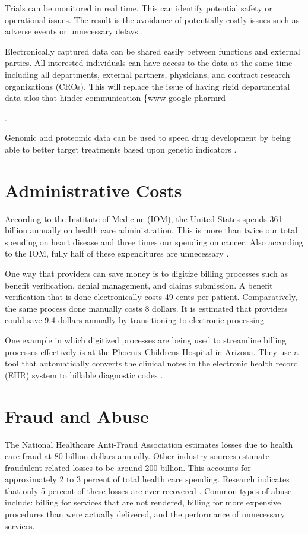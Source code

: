 \documentclass[sigconf]{acmart}
\begin{document}
{Trials can be monitored in real time. This can identify potential safety or operational issues. The result is the avoidance of potentially costly issues such as adverse events or unnecessary delays \cite{www-google-pharmrd}.

Electronically captured data can be shared easily between functions and external parties. All interested individuals can have access to the data at the same time including all departments, external partners, physicians, and contract research organizations (CROs). This will replace the issue of having rigid departmental data silos that hinder communication \{www-google-pharmrd}. 

Genomic and proteomic data can be used to speed drug development by being able to better target treatments based upon genetic indicators \cite{www-google-hadoop}.

\section{Administrative Costs}
According to the Institute of Medicine (IOM), the United States spends 361 billion annually on health care administration.  This is more than twice our total spending on heart disease and three times our spending on cancer. Also according to the IOM, fully half of these expenditures are unnecessary \cite{www-google-data}.

One way that providers can save money is to digitize billing processes such as benefit verification, denial management, and claims submission. A benefit verification that is done electronically costs 49 cents per patient.  Comparatively, the same process done manually costs 8 dollars.  It is estimated that providers could save 9.4 dollars annually by transitioning to electronic processing \cite{www-google-admin}. 

One example in which digitized processes are being used to streamline billing processes effectively is at the Phoenix Childrens Hospital in Arizona.  They use a tool that automatically converts the clinical notes in the electronic health record (EHR) system to billable diagnostic codes \cite{www-google-admin}. 

\section{Fraud and Abuse}
The National Healthcare Anti-Fraud Association estimates losses due to health care fraud at 80 billion dollars annually. Other industry sources estimate fraudulent related losses to be around 200 billion. This accounts for approximately 2 to 3 percent of total health care spending. Research indicates that only 5 percent of these losses are ever recovered \cite{www-google-datameer}.  Common types of abuse include: billing for services that are not rendered, billing for more expensive procedures than were actually delivered, and the performance of unnecessary services. 
\end{document}

